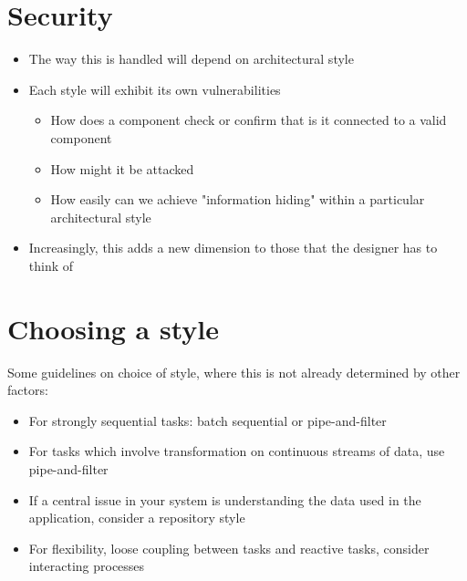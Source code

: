 \documentclass{article}[18pt]
\begin{document}
\section{Security}
\begin{itemize}
	\item The way this is handled will depend on architectural style
	\item Each style will exhibit its own vulnerabilities
	\begin{itemize}
		\item How does a component check or confirm that is it connected to a valid component
		\item How might it be attacked
		\item How easily can we achieve "information hiding" within a particular architectural style
	\end{itemize}
	\item Increasingly, this adds a new dimension to those that the designer has to think of
\end{itemize}
\section{Choosing a style}
Some guidelines on choice of style, where this is not already determined by other factors:
\begin{itemize}
	\item For strongly sequential tasks: batch sequential or pipe-and-filter
	\item For tasks which involve transformation on continuous streams of data, use pipe-and-filter
	\item If a central issue in your system is understanding the data used in the application, consider a repository style
	\item For flexibility, loose coupling between tasks and reactive tasks, consider interacting processes
\end{itemize}
\end{document}
